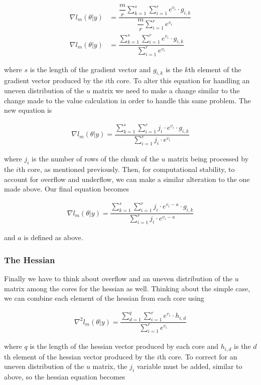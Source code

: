 \documentclass{article}
\begin{document}
\begin{align}
\nabla l_m(\theta|y) &=\dfrac{\dfrac{m}{r} \sum\limits_{k=1}^s \sum\limits_{i=1}^r e^{v_i} \cdot g_{i,k}}{\dfrac{m}{r} \sum\limits_{i=1}^r e^{v_i}} \\
\nabla l_m(\theta|y) &=\dfrac{ \sum\limits_{k=1}^s \sum\limits_{i=1}^r e^{v_i} \cdot g_{i,k}}{\sum\limits_{i=1}^r e^{v_i}}
\end{align}

\noindent where $s$ is the length of the gradient vector and $g_{i,k}$ is the $k$th element of the gradient vector produced by the $i$th core. To alter this equation for handling an uneven distribution of the $u$ matrix we need to make a change similar to the change made to the value calculation in order to handle this same problem. The new equation is

\begin{align}
\nabla l_m(\theta|y) =\dfrac{\sum\limits_{k=1}^s \sum\limits_{i=1}^r j_i \cdot e^{v_i} \cdot g_{i,k}}{\sum\limits_{i=1}^r j_i \cdot e^{v_i}}
\end{align}

\noindent where $j_i$ is the number of rows of the chunk of the $u$ matrix being processed by the $i$th core, as mentioned previously. Then, for computational stability, to account for overflow and underflow, we can make a similar alteration to the one made above. Our final equation becomes

\begin{align}
\nabla l_m(\theta|y) =\dfrac{\sum\limits_{k=1}^s \sum\limits_{i=1}^r j_i \cdot e^{v_i - a} \cdot g_{i,k}}{\sum\limits_{i=1}^r j_i \cdot e^{v_i - a}}
\end{align}

\noindent and $a$ is defined as above. 

\subsubsection{The Hessian}
Finally we have to think about overflow and an uneven distribution of the $u$ matrix among the cores for the hessian as well. Thinking about the simple case, we can combine each element of the hessian from each core using

\begin{align}
\nabla^2 l_m(\theta|y) = \dfrac{\sum\limits_{d=1}^q \sum\limits_{i=1}^r e^{v_i} \cdot h_{i,d}}{\sum\limits_{i=1}^r e^{v_i}}
\end{align}

\noindent where $q$ is the length of the hessian vector produced by each core and $h_{i, d}$ is the $d$th element of the hessian vector produced by the $i$th core. To correct for an uneven distribution of the $u$ matrix, the $j_i$ variable must be added, similar to above, so the hessian equation becomes
\end{document}
